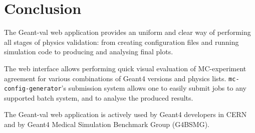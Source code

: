 \section{Conclusion}
\label{sec-status}

The Geant-val web application provides an uniform and clear way of performing all stages of physics validation: from creating configuration files and running simulation code to producing and analysing final plots.

The web interface allows performing quick visual evaluation of MC-experiment agreement for various combinations of Geant4 versions and physics lists. %
\texttt{mc-config-generator}'s submission system allows one to easily submit jobs to any supported batch system, and to analyse the produced results.%

The \textsf{Geant-val} web application
is actively used by Geant4 developers in CERN and by Geant4 Medical Simulation Benchmark Group (G4BSMG).





